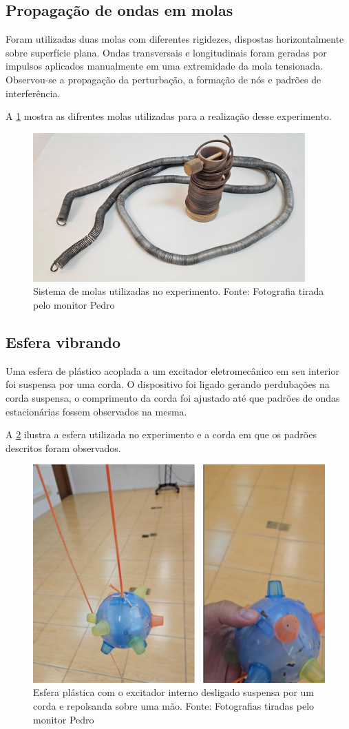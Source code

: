 \subsection{Propagação de ondas em molas}

Foram utilizadas duas molas com diferentes rigidezes, dispostas horizontalmente sobre superfície plana. Ondas transversais e longitudinais foram geradas por impulsos aplicados manualmente em uma extremidade da mola tensionada. Observou-se a propagação da perturbação, a formação de nós e padrões de interferência.

A \cref{fig:ondas} mostra as difrentes molas utilizadas para a realização desse experimento.

\begin{figure}[H]
    \centering
    \includegraphics[width=0.35\linewidth]{fig/ondas.png}
    \caption{Sistema de molas utilizadas no experimento. Fonte: Fotografia tirada pelo monitor Pedro}
    \label{fig:ondas}
\end{figure}

\subsection{Esfera vibrando}

Uma esfera de plástico acoplada a um excitador eletromecânico em seu interior foi suspensa por uma corda. O dispositivo foi ligado gerando perdubações na corda suspensa, o comprimento da corda foi ajustado até que padrões de ondas estacionárias fossem observados na mesma. 

A \cref{fig:esfera} ilustra a esfera utilizada no experimento e a corda em que os padrões descritos foram observados.

\begin{figure}[H]
    \centering
    \includegraphics[width=0.35\linewidth]{fig/esfera.png}
    \caption{Esfera plástica com o excitador interno desligado suspensa por um corda e repolsanda sobre uma mão. Fonte: Fotografias tiradas pelo monitor Pedro}
    \label{fig:esfera}
\end{figure}
